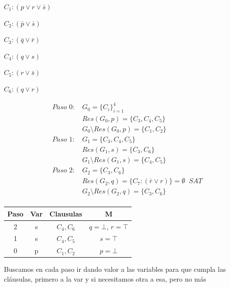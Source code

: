 \documentclass[12pt, twoside, openright]{report} %
\begin{document}
  \begin{multicols}{2}

$C_{1}:(p \vee r \vee \bar{s})$

$C_{2}:(\bar{p} \vee \bar{s})$

$C_{3}:(\bar{q} \vee \bar{r})$

$C_{4}:(q \vee s)$

$C_{5}:(r \vee \bar{s})$

$C_{6}: (q \vee r)$

\columnbreak

\begin{align*}
\textit{Paso 0: } &G_0 = \{C_i\}_{i=1}^4 \\
&Res(G_0, p) = \{ C_3, C_4, C_5 \} \\
&G_0 \setminus Res(G_0, p) = \{ C_1, C_2 \} \\
\textit{Paso 1: } &G_1 = \{ C_3, C_4, C_5 \} \\
&Res(G_1, s) = \{ C_3, C_6 \} \\
&G_1 \setminus Res(G_1, s) = \{ C_4, C_5 \} \\
\textit{Paso 2: } &G_2 = \{C_3, C_6 \} \\
&Res(G_2, q) = \{ C_7:(\bar{r} \vee r) \} = \emptyset \; \; \textit{SAT} \\
&G_2 \setminus Res(G_2, q) = \{ C_3, C_6 \} \\
\end{align*}

\end{multicols}

\begin{table}[H]
\centering
\begin{tabular}{c|c|c|c}
\textbf{Paso}           & \textbf{Var} & \textbf{Clausulas} & \textbf{M}                         \\ \hline
\multicolumn{1}{|c|}{2} & s            & $C_4, C_6$         & \multicolumn{1}{c|}{$q=\bot$, $r=\top$} \\ \hline
\multicolumn{1}{|c|}{1} & s            & $C_4, C_5$         & \multicolumn{1}{c|}{$s=\top$}      \\ \hline
\multicolumn{1}{|c|}{0} & p            & $C_1, C_2$         & \multicolumn{1}{c|}{$p=\bot$}      \\ \hline
\end{tabular}
\end{table}

Buscamos en cada paso ir dando valor a las variables para que cumpla las cláusulas, primero a la var y si necesitamos otra a esa, pero no más
\end{document}
